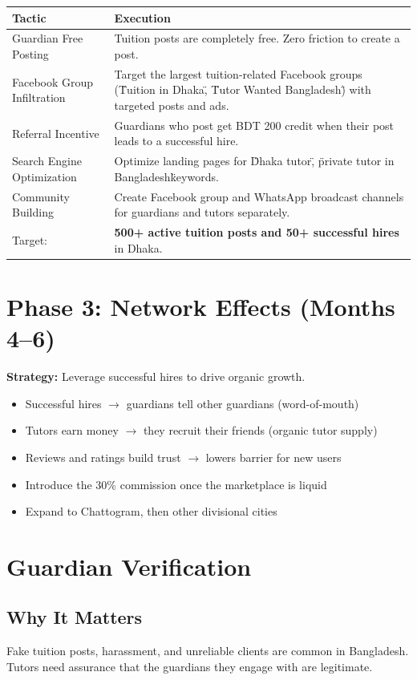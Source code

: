 \documentclass[12pt,a4paper,twoside]{report}
\begin{document}
\begin{longtable}{p{3cm}|p{10cm}}
\toprule
\textbf{Tactic} & \textbf{Execution} \\
\midrule
\endhead
\bottomrule
\endfoot
Guardian Free Posting & Tuition posts are completely free. Zero friction to create a post. \\
Facebook Group Infiltration & Target the largest tuition-related Facebook groups (\"Tuition in Dhaka\", \"Tutor Wanted Bangladesh\") with targeted posts and ads. \\
Referral Incentive & Guardians who post get BDT 200 credit when their post leads to a successful hire. \\
Search Engine Optimization & Optimize landing pages for \"Dhaka tutor\", \"private tutor in Bangladesh\" keywords. \\
Community Building & Create Facebook group and WhatsApp broadcast channels for guardians and tutors separately. \\
Target: & \textbf{500+ active tuition posts and 50+ successful hires} in Dhaka. \\
\bottomrule
\end{longtable}

\section{Phase 3: Network Effects (Months 4--6)}

\textbf{Strategy:} Leverage successful hires to drive organic growth.

\begin{itemize}
    \item Successful hires $\to$ guardians tell other guardians (word-of-mouth)
    \item Tutors earn money $\to$ they recruit their friends (organic tutor supply)
    \item Reviews and ratings build trust $\to$ lowers barrier for new users
    \item Introduce the 30\% commission once the marketplace is liquid
    \item Expand to Chattogram, then other divisional cities
\end{itemize}

\section{Guardian Verification}

\subsection{Why It Matters}
Fake tuition posts, harassment, and unreliable clients are common in Bangladesh. Tutors need assurance that the guardians they engage with are legitimate.
\end{document}
